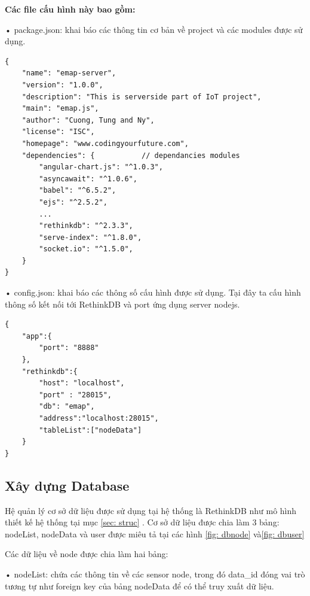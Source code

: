 \textbf{Các file cấu hình này bao gồm:}

• package.json: khai báo các thông tin cơ bản về project và các modules được sử dụng.
\begin{lstlisting}[caption=package.json]
{
	"name": "emap-server",
	"version": "1.0.0",
	"description": "This is serverside part of IoT project",
	"main": "emap.js",
	"author": "Cuong, Tung and Ny",
	"license": "ISC",
	"homepage": "www.codingyourfuture.com",
	"dependencies": {			// dependancies modules
		"angular-chart.js": "^1.0.3",
		"asyncawait": "^1.0.6",
		"babel": "^6.5.2",
		"ejs": "^2.5.2",
		...
		"rethinkdb": "^2.3.3",
		"serve-index": "^1.8.0",
		"socket.io": "^1.5.0",
	}
}
\end{lstlisting}
• config.json: khai báo các thông số cấu hình được sử dụng. Tại đây ta cấu hình thông số kết nối tới RethinkDB và port ứng dụng server nodejs.
\begin{lstlisting}[caption=config.json]
{
	"app":{
		"port": "8888"
	},
	"rethinkdb":{
		"host": "localhost",
		"port" : "28015",
		"db": "emap",
		"address":"localhost:28015",
		"tableList":["nodeData"]
	}
}

\end{lstlisting}





\subsection{Xây dựng Database}
Hệ quản lý cơ sở dữ liệu được sử dụng tại hệ thống là RethinkDB như mô hình thiết kế hệ thống tại mục \ref{sec: struc} . Cơ sở dữ liệu được chia làm 3 bảng: nodeList, nodeData và user được miêu tả tại các hình \ref{fig: dbnode} và\ref{fig: dbuser}

Các dữ liệu về node được chia làm hai bảng:

• nodeList: chứa các thông tin về các sensor node, trong đó data\_id đóng vai trò tương tự như foreign key của bảng nodeData để có thể truy xuất dữ liệu.


